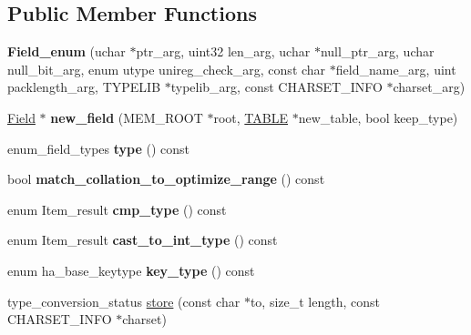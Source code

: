 \subsection*{Public Member Functions}
\begin{DoxyCompactItemize}
\item 
\mbox{\label{classField__enum_aaae250f8690c7f5437aa748b3d6a85c6}} 
{\bfseries Field\+\_\+enum} (uchar $\ast$ptr\+\_\+arg, uint32 len\+\_\+arg, uchar $\ast$null\+\_\+ptr\+\_\+arg, uchar null\+\_\+bit\+\_\+arg, enum utype unireg\+\_\+check\+\_\+arg, const char $\ast$field\+\_\+name\+\_\+arg, uint packlength\+\_\+arg, T\+Y\+P\+E\+L\+IB $\ast$typelib\+\_\+arg, const C\+H\+A\+R\+S\+E\+T\+\_\+\+I\+N\+FO $\ast$charset\+\_\+arg)
\item 
\mbox{\label{classField__enum_a7e1778f531f946c0358d3e6a261522b5}} 
\mbox{\hyperlink{classField}{Field}} $\ast$ {\bfseries new\+\_\+field} (M\+E\+M\+\_\+\+R\+O\+OT $\ast$root, \mbox{\hyperlink{structTABLE}{T\+A\+B\+LE}} $\ast$new\+\_\+table, bool keep\+\_\+type)
\item 
\mbox{\label{classField__enum_aff431b3667b51b2346db55446be9f7c1}} 
enum\+\_\+field\+\_\+types {\bfseries type} () const
\item 
\mbox{\label{classField__enum_adc40ac0cfa3332da75d1d408e80aa165}} 
bool {\bfseries match\+\_\+collation\+\_\+to\+\_\+optimize\+\_\+range} () const
\item 
\mbox{\label{classField__enum_ae46197bb25ad714de1ff2b43764d5cc9}} 
enum Item\+\_\+result {\bfseries cmp\+\_\+type} () const
\item 
\mbox{\label{classField__enum_a816b1a5147f668864a9bbf22a5e2e2e0}} 
enum Item\+\_\+result {\bfseries cast\+\_\+to\+\_\+int\+\_\+type} () const
\item 
\mbox{\label{classField__enum_a535c4536700b64cdc2493d9d014794b2}} 
enum ha\+\_\+base\+\_\+keytype {\bfseries key\+\_\+type} () const
\item 
type\+\_\+conversion\+\_\+status \mbox{\hyperlink{classField__enum_a94360342df3a8e26e37d2e479d36cbb5}{store}} (const char $\ast$to, size\+\_\+t length, const C\+H\+A\+R\+S\+E\+T\+\_\+\+I\+N\+FO $\ast$charset)

\end{DoxyCompactItemize}

